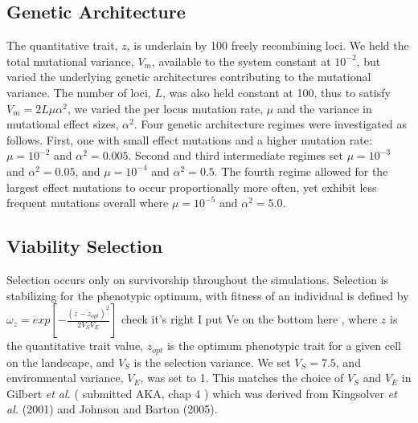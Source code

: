  
 
\subsection{Genetic Architecture}
The quantitative trait, $z$, is underlain by 100 freely recombining loci. We held the total mutational variance, $V_m$, available to the system constant at $10^{-2}$, but varied the underlying genetic architectures contributing to the mutational variance. The number of loci, $L$, was also held constant at 100, thus to satisfy $V_m = 2 L \mu \alpha^2$, we varied the per locus mutation rate, $\mu$ and the variance in mutational effect sizes, $\alpha^2$. 
Four genetic architecture regimes were investigated as follows. First, one with small effect mutations and a higher mutation rate: $\mu = 10^{-2}$ and $\alpha^2 = 0.005$. Second and third intermediate regimes set $\mu = 10^{-3}$ and $\alpha^2 = 0.05$, and $\mu = 10^{-4}$ and $\alpha^2 = 0.5$. The fourth regime allowed for the largest effect mutations to occur proportionally more often, yet exhibit less frequent mutations overall where $\mu = 10^{-5}$ and $\alpha^2 = 5.0$. 



\subsection{Viability Selection}
Selection occurs only on survivorship throughout the simulations. Selection is stabilizing for the phenotypic optimum, with fitness of an individual is defined by $\omega_z = exp[-\frac{(z-z_{opt})^2}{2V_S V_E}]$ \color{red} \footnotesize check it's right I put Ve on the bottom here \normalsize \color{black}  , where $z$ is the quantitative trait value, $z_{opt}$ is the optimum phenotypic trait for a given cell on the landscape, and $V_S$ is the selection variance. We set $V_S = 7.5$, and environmental variance, $V_E$, was set to 1. This matches the choice of $V_S$ and $V_E$ in Gilbert \emph{et al.} (\color{red} \footnotesize submitted AKA, chap 4 \normalsize \color{black}) which was derived from Kingsolver \emph{et al.} (2001) and Johnson and Barton (2005).
 
 
 



